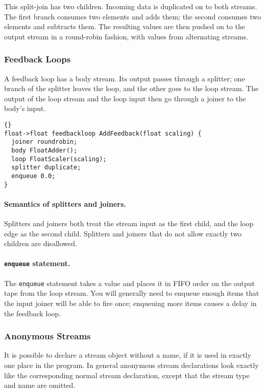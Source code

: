 \documentclass[11pt]{article}
\begin{document}
This split-join has two children.  Incoming data is duplicated on to
both streams.  The first branch consumes two elements and adds them;
the second consumes two elements and subtracts them.  The resulting
values are then pushed on to the output stream in a round-robin
fashion, with values from alternating streams.


\subsubsection{Feedback Loops}

A feedback loop has a body stream.  Its output passes through a
splitter; one branch of the splitter leaves the loop, and the other
goes to the loop stream.  The output of the loop stream and the loop
input then go through a joiner to the body's input.

\begin{lstlisting}{}
float->float feedbackloop AddFeedback(float scaling) {
  joiner roundrobin;
  body FloatAdder();
  loop FloatScaler(scaling);
  splitter duplicate;
  enqueue 0.0;
}
\end{lstlisting}

\paragraph{Semantics of splitters and joiners.}  Splitters and joiners
both treat the stream input as the first child, and the loop edge as
the second child.  Splitters and joiners that do not allow exactly two
children are disallowed.

\paragraph{\lstinline|enqueue| statement.}  The \lstinline|enqueue|
statement takes a value and places it in FIFO order on the output tape
from the loop stream.  You will generally need to enqueue enough items
that the input joiner will be able to fire once; enqueuing more items
causes a delay in the feedback loop.

\subsubsection{Anonymous Streams}
\label{sec:anonymous-streams}

It is possible to declare a stream object without a name, if it is
used in exactly one place in the program.  In general anonymous stream
declarations look exactly like the corresponding normal stream
declaration, except that the stream type and name are omitted.
\end{document}
